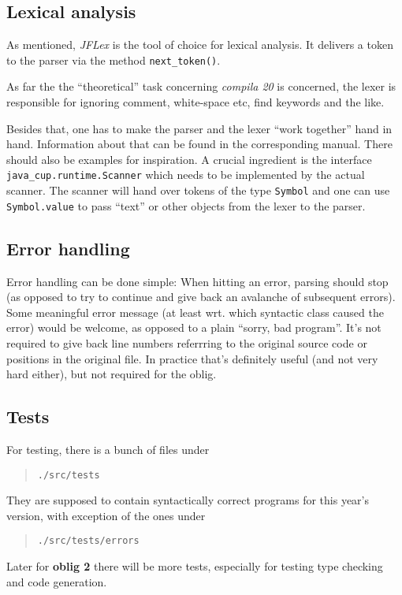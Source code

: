 \documentclass[10pt,freeform]{handout}[2014/08/13]
\begin{document}
\subsection{Lexical analysis}
\label{sec:lexical-analysis}

As mentioned, \textsl{JFLex} is the tool of choice for lexical analysis. It
delivers a token to the parser via the method \texttt{next\_token()}.  

As far the the ``theoretical'' task concerning \textsl{compila 20} is
concerned, the lexer is responsible for ignoring comment, white-space etc,
find keywords and the like.

Besides that, one has to make the parser and the lexer ``work together''
hand in hand. Information about that can be found in the corresponding
manual. There should also be examples for inspiration. A crucial ingredient
is the interface \texttt{java\_cup.runtime.Scanner} which needs to be
implemented by the actual scanner. The scanner will hand over tokens of the
type \texttt{Symbol} and one can use \texttt{Symbol.value} to pass ``text''
or other objects from the lexer to the parser.



\subsection{Error handling}
\label{sec:error-handling}

Error handling can be done simple: When hitting an error, parsing should
stop (as opposed to try to continue and give back an avalanche of
subsequent errors). Some meaningful error message (at least wrt. which
syntactic class caused the error) would be welcome, as opposed to a plain
``sorry, bad program''. It's not required to give back line numbers
referrring to the original source code or positions in the original
file. In practice that's definitely useful (and not very hard either), but
not required for the oblig.




\subsection{Tests}
\label{sec:tests}

For testing, there is a bunch of files under

\begin{quote}
  \texttt{./src/tests}
\end{quote}

They are supposed to contain syntactically correct programs for this year's
version, with exception of the ones under
\begin{quote}
  \texttt{./src/tests/errors}
\end{quote}
Later for \textbf{oblig 2} there will be more tests, especially for testing
type checking and code generation. 
\end{document}
